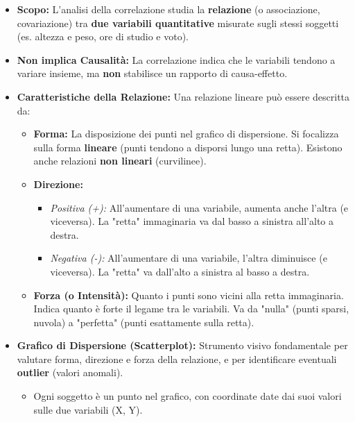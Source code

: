 \documentclass[12pt, a4paper]{article}
\begin{document}
\begin{itemize}
    \item \textbf{Scopo:} L'analisi della correlazione studia la \textbf{relazione} (o associazione, covariazione) tra \textbf{due variabili quantitative} misurate sugli stessi soggetti (es. altezza e peso, ore di studio e voto).
    \item \textbf{Non implica Causalità:} La correlazione indica che le variabili tendono a variare insieme, ma \textbf{non} stabilisce un rapporto di causa-effetto.
    \item \textbf{Caratteristiche della Relazione:} Una relazione lineare può essere descritta da:
        \begin{itemize}
            \item \textbf{Forma:} La disposizione dei punti nel grafico di dispersione. Si focalizza sulla forma \textbf{lineare} (punti tendono a disporsi lungo una retta). Esistono anche relazioni \textbf{non lineari} (curvilinee).
            \item \textbf{Direzione:}
                \begin{itemize}
                    \item \textit{Positiva (+):} All'aumentare di una variabile, aumenta anche l'altra (e viceversa). La "retta" immaginaria va dal basso a sinistra all'alto a destra.
                    \item \textit{Negativa (-):} All'aumentare di una variabile, l'altra diminuisce (e viceversa). La "retta" va dall'alto a sinistra al basso a destra.
                \end{itemize}
            \item \textbf{Forza (o Intensità):} Quanto i punti sono vicini alla retta immaginaria. Indica quanto è forte il legame tra le variabili. Va da "nulla" (punti sparsi, nuvola) a "perfetta" (punti esattamente sulla retta).
        \end{itemize}
    \item \textbf{Grafico di Dispersione (Scatterplot):} Strumento visivo fondamentale per valutare forma, direzione e forza della relazione, e per identificare eventuali \textbf{outlier} (valori anomali).
        \begin{itemize}
            \item Ogni soggetto è un punto nel grafico, con coordinate date dai suoi valori sulle due variabili (X, Y).
        \end{itemize}
\end{itemize}
\end{document}

